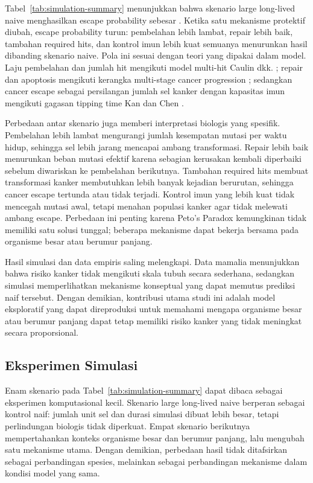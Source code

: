

Tabel~\ref{tab:simulation-summary} menunjukkan bahwa skenario large long-lived
naive menghasilkan escape probability sebesar \NaiveEscapeProbability{}. Ketika
satu mekanisme protektif diubah, escape probability turun: pembelahan lebih lambat,
repair lebih baik, tambahan required hits, dan kontrol imun lebih kuat semuanya
menurunkan hasil dibanding skenario naive. Pola ini sesuai dengan teori yang
dipakai dalam model. Laju pembelahan dan jumlah hit mengikuti model multi-hit
Caulin dkk. \cite{caulin2015}; repair dan apoptosis mengikuti kerangka
multi-stage cancer progression \cite{szasz2024}; sedangkan cancer escape sebagai
persilangan jumlah sel kanker dengan kapasitas imun mengikuti gagasan tipping
time Kan dan Chen \cite{kan2024}.

Perbedaan antar skenario juga memberi interpretasi biologis yang spesifik.
Pembelahan lebih lambat mengurangi jumlah kesempatan mutasi per waktu hidup,
sehingga sel lebih jarang mencapai ambang transformasi. Repair lebih baik
menurunkan beban mutasi efektif karena sebagian kerusakan kembali diperbaiki
sebelum diwariskan ke pembelahan berikutnya. Tambahan required hits membuat
transformasi kanker membutuhkan lebih banyak kejadian berurutan, sehingga
cancer escape tertunda atau tidak terjadi. Kontrol imun yang lebih kuat tidak
mencegah mutasi awal, tetapi menahan populasi kanker agar tidak melewati
ambang escape. Perbedaan ini penting karena Peto's Paradox kemungkinan tidak
memiliki satu solusi tunggal; beberapa mekanisme dapat bekerja bersama pada
organisme besar atau berumur panjang.

Hasil simulasi dan data empiris saling melengkapi. Data mamalia menunjukkan
bahwa risiko kanker tidak mengikuti skala tubuh secara sederhana, sedangkan
simulasi memperlihatkan mekanisme konseptual yang dapat memutus prediksi naif
tersebut. Dengan demikian, kontribusi utama studi ini adalah model eksploratif
yang dapat direproduksi untuk memahami mengapa organisme besar atau berumur
panjang dapat tetap memiliki risiko kanker yang tidak meningkat secara
proporsional.

\subsection{Eksperimen Simulasi}

Enam skenario pada Tabel~\ref{tab:simulation-summary} dapat dibaca sebagai
eksperimen komputasional kecil. Skenario large long-lived naive berperan sebagai
kontrol naif: jumlah unit sel dan durasi simulasi dibuat lebih besar, tetapi
perlindungan biologis tidak diperkuat. Empat skenario berikutnya mempertahankan
konteks organisme besar dan berumur panjang, lalu mengubah satu mekanisme utama.
Dengan demikian, perbedaan hasil tidak ditafsirkan sebagai perbandingan spesies,
melainkan sebagai perbandingan mekanisme dalam kondisi model yang sama.

